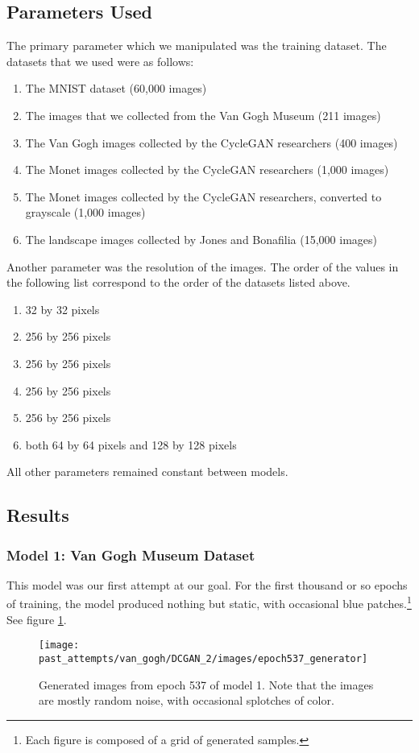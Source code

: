 \documentclass[11pt,letterpaper]{article}
\begin{document}
		\subsection{Parameters Used}
			The primary parameter which we manipulated was the training dataset.
			The datasets that we used were as follows:
			\begin{enumerate}
				\item The MNIST dataset (60,000 images)
				\item The images that we collected from the Van Gogh Museum (211 images)
				\item The Van Gogh images collected by the CycleGAN researchers (400 images)
				\item The Monet images collected by the CycleGAN researchers (1,000 images)
				\item The Monet images collected by the CycleGAN researchers, converted to grayscale (1,000 images)
				\item The landscape images collected by Jones and Bonafilia\cite{otherGanGogh} (15,000 images)
			\end{enumerate}
			Another parameter was the resolution of the images.
			The order of the values in the following list correspond to the order of the datasets listed above.
			\begin{enumerate}
				\item 32 by 32 pixels
				\item 256 by 256 pixels
				\item 256 by 256 pixels
				\item 256 by 256 pixels
				\item 256 by 256 pixels
				\item both 64 by 64 pixels and 128 by 128 pixels  %
			\end{enumerate}
			All other parameters remained constant between models.
		\subsection{Results}
			\subsubsection{Model 1: Van Gogh Museum Dataset}
				This model was our first attempt at our goal.
				For the first thousand or so epochs of training, the model produced nothing but static, with occasional blue patches.\footnote{Each figure is composed of a grid of generated samples.}
				See figure \ref{fig:vgm:epoch537generator}.
				\begin{figure}
					\centering
					\texttt{[image: past\_attempts/van\_gogh/DCGAN\_2/images/epoch537\_generator]}
					\caption[Van Gogh Museum dataset, epoch 537]{Generated images from epoch 537 of model 1. Note that the images are mostly random noise, with occasional splotches of color.}
					\label{fig:vgm:epoch537generator}
				\end{figure}
\end{document}
